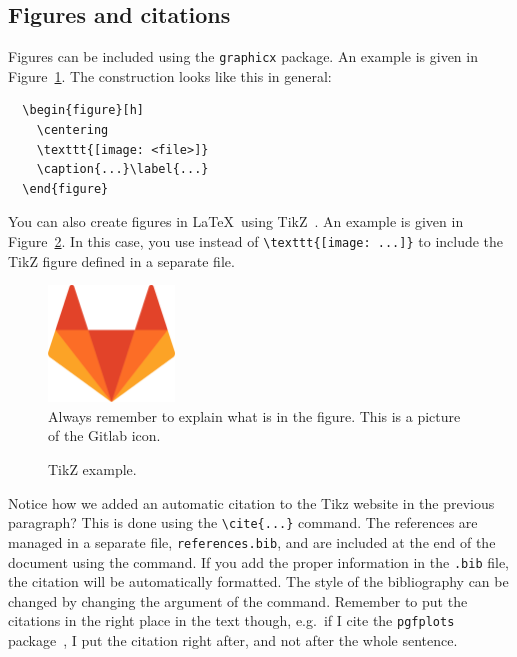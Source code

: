 \documentclass[a4paper,11pt]{article}
\newlength\figureheight %
\newlength\figurewidth
\begin{document}
\subsection{Figures and citations}

Figures can be included using the \texttt{graphicx} package. An example is given in Figure~\ref{fig:gitlab-icon}. The construction looks like this in general:
\begin{verbatim}
  \begin{figure}[h]
    \centering
    \texttt{[image: <file>]}
    \caption{...}\label{...}
  \end{figure}
\end{verbatim}
You can also create figures in \LaTeX~using TikZ~\cite{website:TikZ}. An example is given in Figure~\ref{fig:node}. In this case, you use \verb|| instead of \verb|\texttt{[image: ...]}| to include the TikZ figure defined in a separate file.

\begin{figure}[h]
  \centering
  \includegraphics[width=0.3\textwidth]{figures/gitlab-icon.png}
  \caption{Always remember to explain what is in the figure. This is a picture of the Gitlab icon.}
  \label{fig:gitlab-icon}
\end{figure}

\begin{figure}[!ht]
	\centering
	\setlength\figureheight{3cm}
	\setlength\figurewidth{5cm}
	
	\caption{TikZ example.}
	\label{fig:node}
\end{figure}

Notice how we added an automatic citation to the Tikz website in the previous paragraph? This is done using the \verb|\cite{...}| command. The references are managed in a separate file, \texttt{references.bib}, and are included at the end of the document using the \verb|| command. If you add the proper information in the \texttt{.bib} file, the citation will be automatically formatted. The style of the bibliography can be changed by changing the argument of the \verb|| command. Remember to put the citations in the right place in the text though, e.g.\ if I cite the \texttt{pgfplots} package~\cite{website:pgfplots}, I put the citation right after, and not after the whole sentence.
\end{document}
